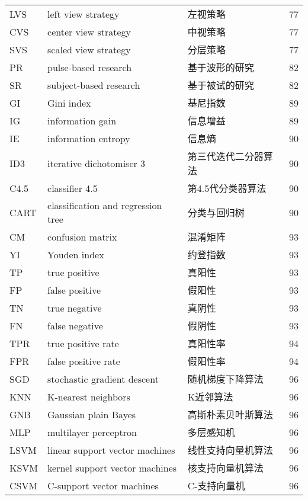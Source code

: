 \begin{center}
\begin{longtable}{m{2cm}m{7cm}m{5cm}m{1cm}<{\centering}}
        LVS & left view strategy & 左视策略 & 77 \\
        CVS & center view strategy & 中视策略 & 77 \\
        SVS & scaled view strategy & 分层策略 & 77 \\
        

        PR & pulse-based research & 基于波形的研究 & 82 \\
        SR & subject-based research &基于被试的研究 & 82 \\

        GI & Gini index & 基尼指数 & 89 \\
        IG & information gain & 信息增益 & 89 \\
        IE & information entropy & 信息熵 & 90 \\
        ID3 & iterative dichotomiser 3 & 第三代迭代二分器算法 & 90 \\
        C4.5 & classifier 4.5 & 第4.5代分类器算法 & 90 \\ 
        CART & classification and regression tree & 分类与回归树 & 90 \\
        CM & confusion matrix & 混淆矩阵 & 93 \\
        YI  & Youden index & 约登指数& 93 \\
        TP &  true positive & 真阳性 & 93 \\
        FP & false positive & 假阳性 & 93 \\
        TN & true negative & 真阴性 & 93 \\
        FN & false negative & 假阴性 & 93 \\
        TPR &  true positive rate & 真阳性率 & 94 \\
        FPR & false positive rate& 假阳性率 & 94 \\

        SGD & stochastic gradient descent & 随机梯度下降算法 & 96 \\
        KNN & K-nearest neighbors & K近邻算法 & 96 \\
        GNB & Gaussian plain Bayes & 高斯朴素贝叶斯算法 & 96 \\
        MLP&multilayer perceptron&多层感知机 & 96\\
        LSVM & linear support vector machines & 线性支持向量机算法 & 96 \\
        KSVM & kernel support vector machines & 核支持向量机算法 & 96 \\
        CSVM & C-support vector machines & C-支持向量机 & 96 \\
	\end{longtable}
\end{center}